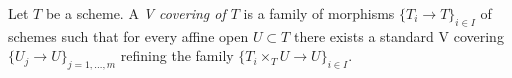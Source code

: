 \begin{definition}
\label{definition-V-covering}
Let $T$ be a scheme. A {\it V covering of $T$} is a family
of morphisms $\{T_i \to T\}_{i \in I}$ of schemes such that for every
affine open $U \subset T$ there exists a standard V covering
$\{U_j \to U\}_{j = 1, \ldots, m}$ refining the family
$\{T_i \times_T U \to U\}_{i \in I}$.
\end{definition}